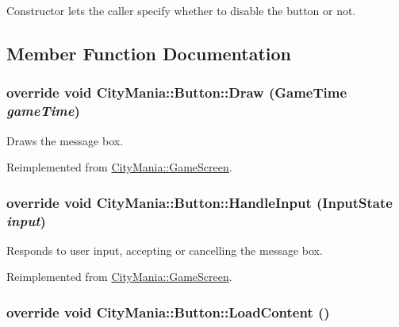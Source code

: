Constructor lets the caller specify whether to disable the button or not. 

\subsection{Member Function Documentation}
\hypertarget{classCityMania_1_1Button_a48ed467fa9522c528d4369dc27fd1418}{
\subsubsection[{Draw}]{\setlength{\rightskip}{0pt plus 5cm}override void CityMania::Button::Draw (GameTime {\em gameTime})}}
\label{classCityMania_1_1Button_a48ed467fa9522c528d4369dc27fd1418}


Draws the message box. 

Reimplemented from \hyperlink{classCityMania_1_1GameScreen_a28fbcdba21da5e606d32d87b18bcdf29}{CityMania::GameScreen}.\hypertarget{classCityMania_1_1Button_a7ffb254c3a65d1357d6f3c6dee74c4ab}{
\subsubsection[{HandleInput}]{\setlength{\rightskip}{0pt plus 5cm}override void CityMania::Button::HandleInput ({\bf InputState} {\em input})}}
\label{classCityMania_1_1Button_a7ffb254c3a65d1357d6f3c6dee74c4ab}


Responds to user input, accepting or cancelling the message box. 

Reimplemented from \hyperlink{classCityMania_1_1GameScreen_a80edab75e121f4e08b007f47206cf29c}{CityMania::GameScreen}.\hypertarget{classCityMania_1_1Button_a6b056904b50808d69f7699dcde88415d}{
\subsubsection[{LoadContent}]{\setlength{\rightskip}{0pt plus 5cm}override void CityMania::Button::LoadContent ()}}
\label{classCityMania_1_1Button_a6b056904b50808d69f7699dcde88415d}



